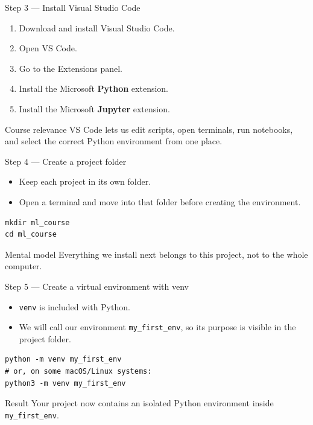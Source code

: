 \documentclass[aspectratio=169]{beamer}
\newcommand{\coursefooter}{}
\begin{document}
\begin{frame}{Step 3 --- Install Visual Studio Code}
\begin{enumerate}
\item Download and install Visual Studio Code.
\item Open VS Code.
\item Go to the Extensions panel.
\item Install the Microsoft \textbf{Python} extension.
\item Install the Microsoft \textbf{Jupyter} extension.
\end{enumerate}
\begin{block}{Course relevance}
VS Code lets us edit scripts, open terminals, run notebooks, and select the correct Python environment from one place.
\end{block}
\coursefooter
\end{frame}

\begin{frame}[fragile]{Step 4 --- Create a project folder}
\begin{itemize}
\item Keep each project in its own folder.
\item Open a terminal and move into that folder before creating the environment.
\end{itemize}
\begin{lstlisting}[style=coursebash]
mkdir ml_course
cd ml_course
\end{lstlisting}
\begin{block}{Mental model}
Everything we install next belongs to this project, not to the whole computer.
\end{block}
\coursefooter
\end{frame}

\begin{frame}[fragile]{Step 5 --- Create a virtual environment with venv}
\begin{itemize}
\item \texttt{venv} is included with Python.
\item We will call our environment \texttt{my\_first\_env}, so its purpose is visible in the project folder.
\end{itemize}
\begin{lstlisting}[style=coursebash]
python -m venv my_first_env
# or, on some macOS/Linux systems:
python3 -m venv my_first_env
\end{lstlisting}
\begin{block}{Result}
Your project now contains an isolated Python environment inside \texttt{my\_first\_env}.
\end{block}
\coursefooter
\end{frame}
\end{document}
